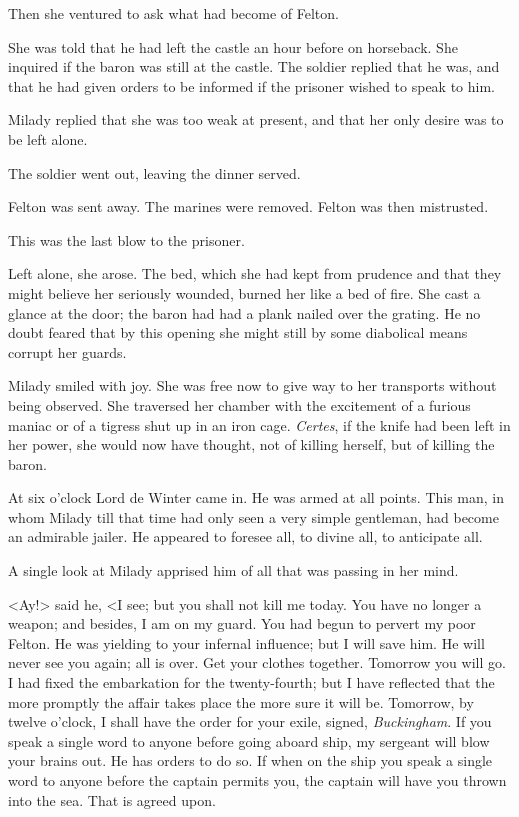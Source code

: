 Then she ventured to ask what had become of Felton. 

She was told that he had left the castle an hour before on horseback. She inquired if the baron was still at the castle. The soldier replied that he was, and that he had given orders to be informed if the prisoner wished to speak to him. 

Milady replied that she was too weak at present, and that her only desire was to be left alone. 

The soldier went out, leaving the dinner served. 

Felton was sent away. The marines were removed. Felton was then mistrusted. 

This was the last blow to the prisoner. 

Left alone, she arose. The bed, which she had kept from prudence and that they might believe her seriously wounded, burned her like a bed of fire. She cast a glance at the door; the baron had had a plank nailed over the grating. He no doubt feared that by this opening she might still by some diabolical means corrupt her guards. 

Milady smiled with joy. She was free now to give way to her transports without being observed. She traversed her chamber with the excitement of a furious maniac or of a tigress shut up in an iron cage. \textit{Certes}, if the knife had been left in her power, she would now have thought, not of killing herself, but of killing the baron. 

At six o'clock Lord de Winter came in. He was armed at all points. This man, in whom Milady till that time had only seen a very simple gentleman, had become an admirable jailer. He appeared to foresee all, to divine all, to anticipate all. 

A single look at Milady apprised him of all that was passing in her mind. 

<Ay!> said he, <I see; but you shall not kill me today. You have no longer a weapon; and besides, I am on my guard. You had begun to pervert my poor Felton. He was yielding to your infernal influence; but I will save him. He will never see you again; all is over. Get your clothes together. Tomorrow you will go. I had fixed the embarkation for the twenty-fourth; but I have reflected that the more promptly the affair takes place the more sure it will be. Tomorrow, by twelve o'clock, I shall have the order for your exile, signed, \emph{Buckingham}. If you speak a single word to anyone before going aboard ship, my sergeant will blow your brains out. He has orders to do so. If when on the ship you speak a single word to anyone before the captain permits you, the captain will have you thrown into the sea. That is agreed upon. 

